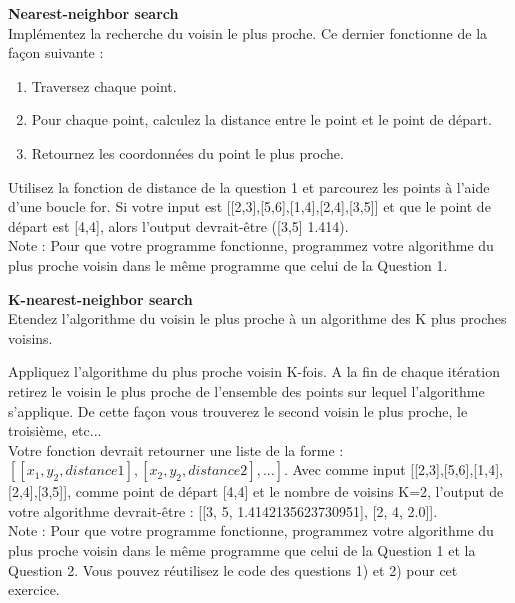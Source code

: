 \begin{Exercice}[10 minutes]\textbf{Nearest-neighbor search}\\

Implémentez la recherche du voisin le plus proche. Ce dernier fonctionne de la façon suivante :
\begin{enumerate}
    \item Traversez chaque point.
    \item Pour chaque point, calculez la distance entre le point et le point de départ.
    \item Retournez les coordonnées du point le plus proche.
\end{enumerate}
    
\begin{conseil}
    Utilisez la fonction de distance de la question 1 et parcourez les points à l'aide d'une boucle for. Si votre input est [[2,3],[5,6],[1,4],[2,4],[3,5]] et que le point de départ est [4,4], alors l'output devrait-être ([3,5] 1.414).\\
    
    Note : Pour que votre programme fonctionne, programmez votre algorithme du plus proche voisin dans le même programme que celui de la Question 1.
\end{conseil}
\begin{solution}
    
\end{solution}
\end{Exercice}


\begin{Exercice}[15 minutes]\textbf{K-nearest-neighbor search}\\


Etendez l'algorithme du voisin le plus proche à un algorithme des K plus proches voisins.\\

\begin{conseil}
Appliquez l'algorithme du plus proche voisin K-fois. A la fin de chaque itération retirez le voisin le plus proche de l'ensemble des points sur lequel l'algorithme s'applique. De cette façon vous trouverez le second voisin le plus proche, le troisième, etc...\\

Votre fonction devrait retourner une liste de la forme : $[[x_1,y_2, distance1],[x_2,y_2,distance2],...]$. Avec comme input [[2,3],[5,6],[1,4],[2,4],[3,5]], comme point de départ [4,4] et le nombre de voisins K=2, l'output de votre algorithme devrait-être : [[3, 5, 1.4142135623730951], [2, 4, 2.0]].\\

Note : Pour que votre programme fonctionne, programmez votre algorithme du plus proche voisin dans le même programme que celui de la Question 1 et la Question 2. Vous pouvez réutilisez le code des questions 1) et 2) pour cet exercice.
\end{conseil}

\begin{solution}
    
\end{solution}
\end{Exercice}
\newpage
